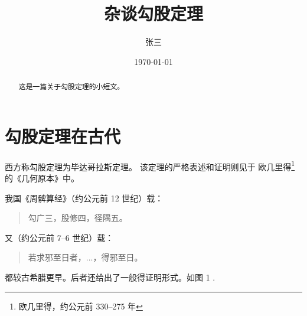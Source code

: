 \documentclass[UTF8]{ctexart}
\title{杂谈勾股定理}
\author{张三}
\date{\today}
\begin{document}
    \maketitle

    \begin{abstract}
        这是一篇关于勾股定理的小短文。
    \end{abstract}

    \tableofcontents            %
    
    \section{勾股定理在古代}
        西方称勾股定理为毕达哥拉斯定理\cite{Kline}。
        该定理的严格表述和证明则见于
        欧几里得\footnote{欧几里得，约公元前 330--275 年}
        的《几何原本》中。

        我国《周髀算经》（约公元前 12 世纪）载：
        \begin{quote}           %
            \kaishu   %
            勾广三，股修四，径隅五。
        \end{quote}
        又（约公元前 7--6 世纪）载：
        \begin{quote}
            \kaishu
            若求邪至日者，...，得邪至日。
        \end{quote}
        都较古希腊更早。后者还给出了一般得证明形式。如图 1 \cite{quanjing}.
        \newpage
        \par
\end{document}
